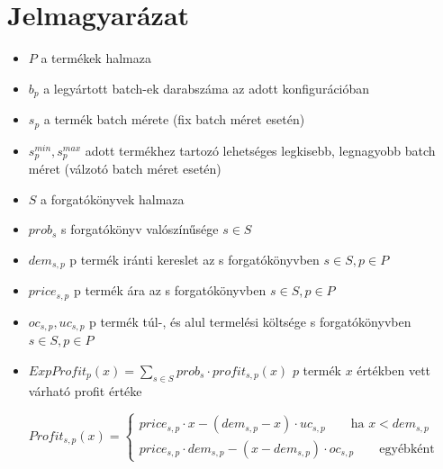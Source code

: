 \appendix
\chapter{Jelmagyarázat}
\begin {itemize}
\item[] $P$ a termékek halmaza
\item[] $b_p$ a legyártott batch-ek darabszáma az adott konfigurációban
\item[] $s_p$ a termék batch mérete (fix batch méret esetén)
\item[] $s_p^{min},s_p^{max}$ adott termékhez tartozó lehetséges legkisebb, legnagyobb batch méret (válzotó batch méret esetén)
\item[] $S$ a forgatókönyvek halmaza
\item[] $prob_s$ s forgatókönyv valószínűsége $s	\in S$
\item[] $dem_{s,p}$ p termék iránti kereslet az s forgatókönyvben $s	\in S, p	\in P$
\item[] $price_{s,p}$ p termék ára az s forgatókönyvben $s	\in S, p	\in P$
\item[] $oc_{s,p}, uc_{s,p}$ p termék túl-, és alul termelési költsége s forgatókönyvben $s	\in S, p	\in P$
\item[]$ExpProfit_p(x)=\sum_{s \in S}prob_s \cdot profit_{s,p}(x)$ $p$ termék $x$ értékben vett várható profit értéke
\end {itemize}
\begin{equation*}
Profit_{s,p}(x)= \begin{cases}
            price_{s,p}\cdot x-(dem_{s,p}-x) \cdot uc_{s,p}\qquad \text{ha } x<dem_{s,p} \\
            price_{s,p} \cdot dem_{s,p}-(x-dem_{s,p}) \cdot oc_{s,p}\qquad \text{egyébként}
       \end{cases}
\end{equation*}

